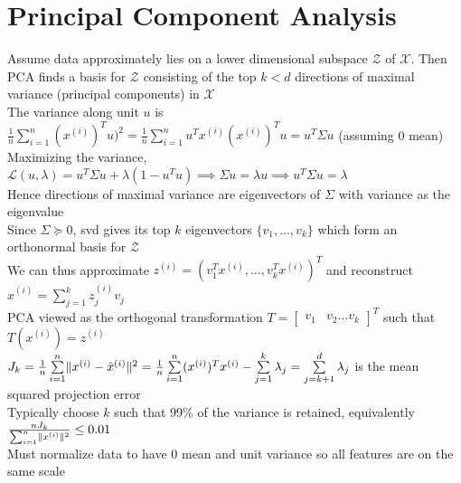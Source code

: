\documentclass{article}
\DeclarePairedDelimiter\norm{\lVert}{\rVert}
\begin{document}
\section{Principal Component Analysis}
Assume data approximately lies on a lower dimensional subspace $\mathcal{Z}$ of $\mathcal{X}$. Then PCA finds a basis for $\mathcal{Z}$ consisting of the top $k < d$ directions of maximal variance (principal components) in $\mathcal{X}$ \\
The variance along unit $u$ is $\frac{1}{n}\sum_{i=1}^n(x^{(i)})^T u)^2 = \frac{1}{n}\sum_{i=1}^n u^T x^{(i)}(x^{(i)})^Tu = u^T \Sigma u$ (assuming 0 mean) \\
Maximizing the variance, $\mathcal{L}(u, \lambda) = u^T \Sigma u + \lambda(1 - u^Tu) \implies \Sigma u = \lambda u \implies u^T \Sigma u = \lambda$  \\
Hence directions of maximal variance are eigenvectors of $\Sigma$ with variance as the eigenvalue \\
Since $\Sigma \succeq 0$, svd gives its top $k$ eigenvectors $\{v_1, \ldots, v_k\}$ which form an orthonormal basis for $\mathcal{Z}$ \\
We can thus approximate $z^{(i)} = (v_1^T x^{(i)}, \ldots, v_k^T x^{(i)})^T$ and reconstruct $\hat{x}^{(i)} = \sum_{j=1}^k z^{(i)}_j v_j$ \\
PCA viewed as the orthogonal transformation $T = \begin{bmatrix}v_1 & v_2 \ldots v_k\end{bmatrix}^T$ such that $T(x^{(i)}) = z^{(i)}$ \\
$J_k = \frac{1}{n} \sum\limits_{i=1}^n \norm{x^{(i)} - \hat{x}^{(i)}}^2 =  \frac{1}{n}\sum\limits_{i=1}^n (x^{(i)})^Tx^{(i)} - \sum\limits_{j=1}^k \lambda_j = \sum\limits_{j=k+1}^d \lambda_j$ is the mean squared projection error \\
Typically choose $k$ such that 99$\%$ of the variance is retained, equivalently $\frac{nJ_k}{\sum_{i=1}^n\norm{x^{(i)}}^2} \leq 0.01$ \\
Must normalize data to have 0 mean and unit variance so all features are on the same scale


\newpage
\end{document}
